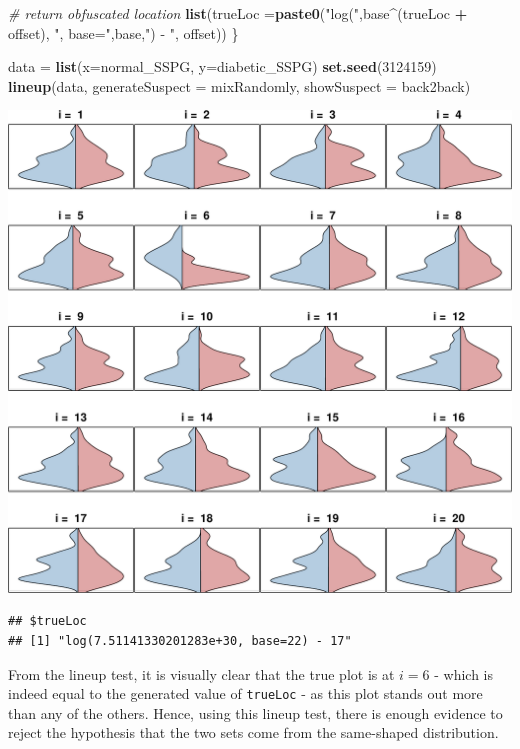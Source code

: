 \documentclass[9pt,letter]{article}
\newenvironment{Shaded}{\begin{snugshade}}{\end{snugshade}}
\newcommand{\KeywordTok}[1]{\textcolor[rgb]{0.13,0.29,0.53}{\textbf{#1}}}
\newcommand{\DataTypeTok}[1]{\textcolor[rgb]{0.13,0.29,0.53}{#1}}
\newcommand{\DecValTok}[1]{\textcolor[rgb]{0.00,0.00,0.81}{#1}}
\newcommand{\StringTok}[1]{\textcolor[rgb]{0.31,0.60,0.02}{#1}}
\newcommand{\CommentTok}[1]{\textcolor[rgb]{0.56,0.35,0.01}{\textit{#1}}}
\newcommand{\OperatorTok}[1]{\textcolor[rgb]{0.81,0.36,0.00}{\textbf{#1}}}
\newcommand{\NormalTok}[1]{#1}
\begin{document}
\begin{Shaded}
\begin{Highlighting}[]
  \CommentTok{# return obfuscated location}
  \KeywordTok{list}\NormalTok{(}\DataTypeTok{trueLoc =}\KeywordTok{paste0}\NormalTok{(}\StringTok{"log("}\NormalTok{,base}\OperatorTok{^}\NormalTok{(trueLoc }\OperatorTok{+}\StringTok{ }\NormalTok{offset),}
                       \StringTok{", base="}\NormalTok{,base,}\StringTok{") - "}\NormalTok{, offset))}
\NormalTok{\}}

\NormalTok{data =}\StringTok{ }\KeywordTok{list}\NormalTok{(}\DataTypeTok{x=}\NormalTok{normal_SSPG, }\DataTypeTok{y=}\NormalTok{diabetic_SSPG)}
\KeywordTok{set.seed}\NormalTok{(}\DecValTok{3124159}\NormalTok{)}
\KeywordTok{lineup}\NormalTok{(data,}
       \DataTypeTok{generateSuspect =}\NormalTok{ mixRandomly,}
       \DataTypeTok{showSuspect =}\NormalTok{ back2back)}
\end{Highlighting}
\end{Shaded}

\begin{center}\includegraphics{a4_solutions_files/figure-latex/unnamed-chunk-5-1} \end{center}

\begin{verbatim}
## $trueLoc
## [1] "log(7.51141330201283e+30, base=22) - 17"
\end{verbatim}

From the lineup test, it is visually clear that the true plot is at
\(i = 6\) - which is indeed equal to the generated value of
\texttt{trueLoc} - as this plot stands out more than any of the others.
Hence, using this lineup test, there is enough evidence to reject the
hypothesis that the two sets come from the same-shaped distribution.
\end{document}
